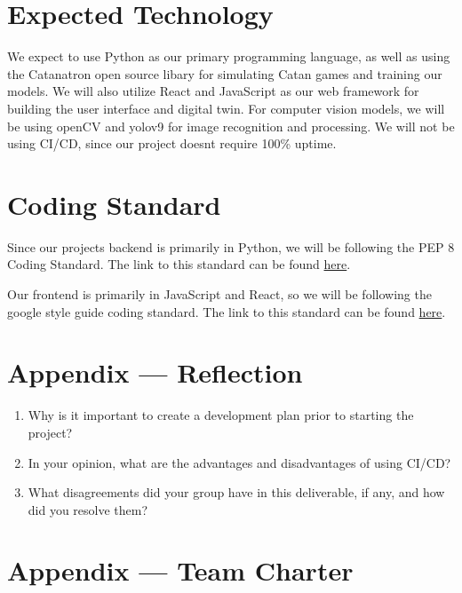 \documentclass{article}
\begin{document}
\section{Expected Technology}

\raggedright
We expect to use Python as our primary programming 
language, as well as using the Catanatron open source 
libary for simulating Catan games and training our models.
We will also utilize React and JavaScript as 
our web framework for building the user interface and 
digital twin. For computer vision models, we will be using
openCV and yolov9 for image recognition and processing. We
will not be using CI/CD, since our project doesnt require 100\% uptime.


\section{Coding Standard}

Since our projects backend is primarily in Python, we will be following the PEP 8 Coding
Standard. The link to this standard can be found
\href{https://peps.python.org/pep-0008/}{here}.

\medskip

Our frontend is primarily in JavaScript and React, so we will be following the google style guide
coding standard. The link to this standard can be found \href{https://google.github.io/styleguide/jsguide.html}{here}.

\newpage{}

\section*{Appendix --- Reflection}




\begin{enumerate}
    \item Why is it important to create a development plan prior to starting the
    project?
    \item In your opinion, what are the advantages and disadvantages of using
    CI/CD?
    \item What disagreements did your group have in this deliverable, if any,
    and how did you resolve them?
\end{enumerate}

\newpage{}

\section*{Appendix --- Team Charter}
\end{document}
